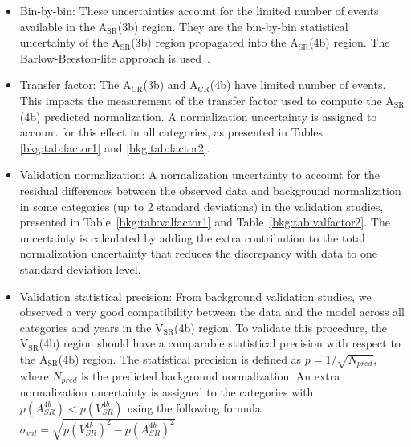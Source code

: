 \begin{itemize}
    \item {Bin-by-bin:} These uncertainties account for the limited number of events available in the $\mathrm{A_{SR}}$(3b) region. They are the bin-by-bin statistical uncertainty of the $\mathrm{A_{SR}}$(3b) region propagated into the $\mathrm{A_{SR}}$(4b) region. The Barlow-Beeston-lite approach is used~\cite{Barlow:1993dm}.   
    \item {Transfer factor:} The $\mathrm{A_{CR}}$(3b) and $\mathrm{A_{CR}}$(4b) have limited number of events. This impacts the measurement of the transfer factor used to compute the $\mathrm{A_{SR}}$(4b) predicted normalization. A normalization uncertainty is assigned to account for this effect in all categories, as presented in Tables \ref{bkg:tab:factor1} and \ref{bkg:tab:factor2}.
    \item {Validation normalization:} A normalization uncertainty to account for the residual differences between the observed data and background normalization in some categories (up to 2 standard deviations) in the validation studies, presented in Table~\ref{bkg:tab:valfactor1} and Table~\ref{bkg:tab:valfactor2}. The uncertainty is calculated by adding the extra contribution to the total normalization uncertainty that reduces the discrepancy with data to one standard deviation level. 
    \item {Validation statistical precision:} From background validation studies, we observed a very good compatibility between the data and the model across all categories and years in the $\mathrm{V_{SR}}$(4b) region. To validate this procedure, the $\mathrm{V_{SR}}$(4b) region should have a comparable statistical precision with respect to the $\mathrm{A_{SR}}$(4b) region. The statistical precision is defined as $p=1/\sqrt{N_{pred} }$, where $N_{pred}$ is the predicted background normalization. An extra normalization uncertainty is assigned to the categories with $p(A_{SR}^{4b})<p(V_{SR}^{4b})$ using the following formula: $\sigma_{val}=\sqrt{ p(V_{SR}^{4b})^{2} - p(A_{SR}^{4b})^{2}}$.

\end{itemize}
